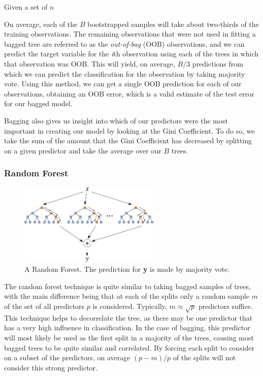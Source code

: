 \documentclass[preprint,12pt]{elsarticle}
\begin{document}
Given a set of $n$ 

On average, each of the $B$ bootstrapped samples will take about two-thirds of the training observations.  The remaining observations that were not used in fitting a bagged tree are referred to as the \textit{out-of-bag} (OOB) observations, and we can predict the target variable for the \textit{i}th observation using each of the trees in which that observation was OOB. This will yield, on average, $B/3$ predictions from which we can predict the classification for the observation by taking majority vote.\cite{ISLR} Using this method, we can get a single OOB prediction for each of our observations, obtaining an OOB error, which is a valid estimate of the test error for our bagged model.

Bagging also gives us insight into which of our predictors were the most important in creating our model by looking at the Gini Coefficient. To do so, we take the sum of the amount that the Gini Coefficient has decreased by splitting on a given predictor and take the average over our $B$ trees.

\subsubsection{Random Forest}


\begin{figure}[h]
	\centering
	\includegraphics[width=0.6\textwidth]{RF}
	\caption{A Random Forest. The prediction for \textbf{y} is made by majority vote.}
\end{figure}

The random forest technique is quite similar to taking bagged  samples of trees, with the main difference being that at each of the splits only a random sample $m$ of the set of all predictors $p$ is considered. Typically, $m \approx \sqrt{p}$ predictors suffice. This technique helps to decorrelate the tree, as there may be one predictor that has a very high influence in classification. In the case of bagging, this predictor will most likely be used as the first split in a majority of the trees, causing most bagged trees to be quite similar and correlated. By forcing each split to consider on a subset of the predictors, on average $(p-m)/p$ of the splits will not consider this strong predictor\cite{Breiman2001}.
\end{document}
